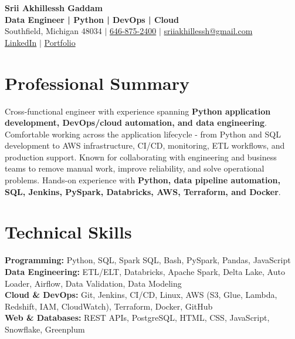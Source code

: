 \documentclass[letterpaper,10pt]{article}
\begin{document}
\fontsize{9.35pt}{10.45pt}\selectfont

\begin{center}
    {\LARGE \textbf{Srii Akhillessh Gaddam}} \\[-1pt]
    \textbf{Data Engineer | Python | DevOps | Cloud} \\[2pt]
    Southfield, Michigan 48034 $|$
    \href{tel:6468752400}{646-875-2400} $|$
    \href{mailto:sriiakhillessh@gmail.com}{sriiakhillessh@gmail.com} \\[1pt]
    \href{https://www.linkedin.com/in/srii-akhiilessh-gaddam-b48668191/}{LinkedIn} $|$
    \href{https://sriiakhillesshg.github.io/portfolio/}{Portfolio}
\end{center}
\vspace{-8pt}

\section{Professional Summary}
\small{Cross-functional engineer with experience spanning \textbf{Python application development, DevOps/cloud automation, and data engineering}. Comfortable working across the application lifecycle - from Python and SQL development to AWS infrastructure, CI/CD, monitoring, ETL workflows, and production support. Known for collaborating with engineering and business teams to remove manual work, improve reliability, and solve operational problems. Hands-on experience with \textbf{Python, data pipeline automation, SQL, Jenkins, PySpark, Databricks, AWS, Terraform, and Docker}.}

\section{Technical Skills}
\small{
\textbf{Programming:} Python, SQL, Spark SQL, Bash, PySpark, Pandas, JavaScript \\
\textbf{Data Engineering:} ETL/ELT, Databricks, Apache Spark, Delta Lake, Auto Loader, Airflow, Data Validation, Data Modeling \\
\textbf{Cloud \& DevOps:} Git, Jenkins, CI/CD, Linux, AWS (S3, Glue, Lambda, Redshift, IAM, CloudWatch), Terraform, Docker, GitHub \\
\textbf{Web \& Databases:} REST APIs, PostgreSQL, HTML, CSS, JavaScript, Snowflake, Greenplum
}

\end{document}
